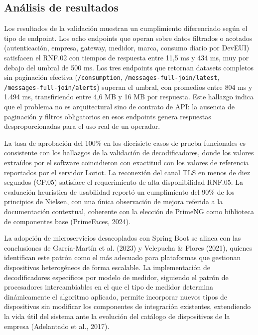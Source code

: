\documentclass[12pt,a4paper,oneside]{report}
\begin{document}
\subsection{Análisis de resultados}\label{subsec:analisis-resultados}

Los resultados de la validación muestran un cumplimiento diferenciado según el tipo de endpoint. Los ocho endpoints que operan sobre datos filtrados o acotados (autenticación, empresa, gateway, medidor, marca, consumo diario por DevEUI) satisfacen el RNF.02 con tiempos de respuesta entre 11,5 ms y 434 ms, muy por debajo del umbral de 500 ms. Los tres endpoints que retornan datasets completos sin paginación efectiva (\texttt{/consumption}, \texttt{/messages-full-join/latest}, \texttt{/messages-full-join/alerts}) superan el umbral, con promedios entre 804 ms y 1.494 ms, transfiriendo entre 4,6 MB y 16 MB por respuesta. Este hallazgo indica que el problema no es arquitectural sino de contrato de API: la ausencia de paginación y filtros obligatorios en esos endpoints genera respuestas desproporcionadas para el uso real de un operador.

La tasa de aprobación del 100\% en los diecisiete casos de prueba funcionales es consistente con los hallazgos de la validación de decodificadores, donde los valores extraídos por el software coincidieron con exactitud con los valores de referencia reportados por el servidor Loriot. La reconexión del canal TLS en menos de diez segundos (CP.05) satisface el requerimiento de alta disponibilidad RNF.05. La evaluación heurística de usabilidad reportó un cumplimiento del 90\% de los principios de Nielsen, con una única observación de mejora referida a la documentación contextual, coherente con la elección de PrimeNG como biblioteca de componentes base (PrimeFaces, 2024).

La adopción de microservicios desacoplados con Spring Boot se alinea con las conclusiones de García-Martín et al. (2023) y Velepucha \& Flores (2021), quienes identifican este patrón como el más adecuado para plataformas que gestionan dispositivos heterogéneos de forma escalable. La implementación de decodificadores específicos por modelo de medidor, siguiendo el patrón de procesadores intercambiables en el que el tipo de medidor determina dinámicamente el algoritmo aplicado, permite incorporar nuevos tipos de dispositivos sin modificar los componentes de integración existentes, extendiendo la vida útil del sistema ante la evolución del catálogo de dispositivos de la empresa (Adelantado et al., 2017).
\end{document}
